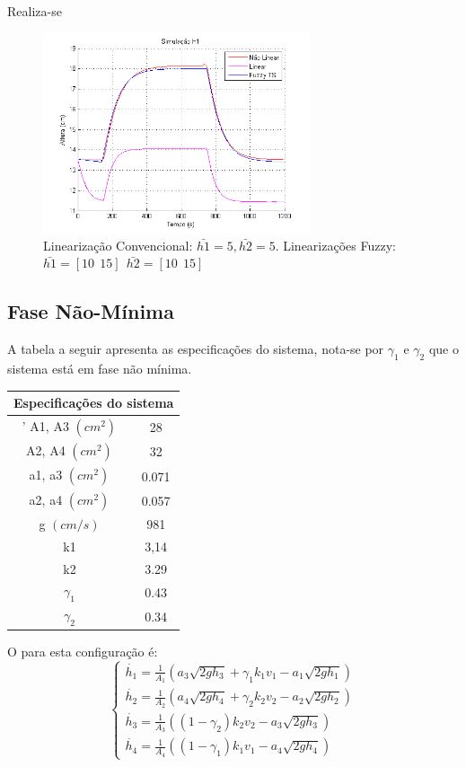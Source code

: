 Realiza-se
\begin{figure}[H]
	\centering
	\includegraphics[width=0.7\textwidth]{img/FM_h1_5_10_15.png}
	\caption{\small Linearização Convencional: $ \bar{h1}=5, \bar{h2}=5$. Linearizações Fuzzy: $\bar{h1}=[10 \ \ 15] \ \ \bar{h2}=[10 \ \ 15]$ }
	\label{figH1FM_1}
\end{figure}

\subsection{Fase Não-Mínima}
A tabela a seguir apresenta as especificações do sistema, nota-se por $\gamma_1$ e $\gamma_2$ que o sistema está em fase não mínima.
\begin{center}
	\begin{tabular}{|c|c|}
		\hline
		\multicolumn{2}{|c|}{Especificações do sistema} \\
		\hline'
		A1, A3 $(cm^2)$ & 28 \\ \hline
		A2, A4 $(cm^2)$ & 32 \\ \hline
		a1, a3 $(cm^2)$ & 0.071 \\ \hline
		a2, a4 $(cm^2)$ & 0.057 \\ \hline
		g $(cm/s)$ & 981 \\ \hline
		k1 & 3,14 \\ \hline
		k2 & 3.29 \\ \hline
		$\gamma_1$ & 0.43 \\ \hline
		$\gamma_2$ & 0.34 \\ \hline
		\hline
	\end{tabular}
\end{center}

O  para esta configuração é:
\begin{equation}
\begin{cases}
	\dot{h_{1}} = \frac{1}{A_{1}}(a_{3}\sqrt{2gh_{3}} + \gamma_{1}k_{1}v_{1} - a_{1}\sqrt{2gh_{1}})\\
	
	\dot{h_{2}} = \frac{1}{A_{2}}(a_{4}\sqrt{2gh_{4}} + \gamma_{2}k_{2}v_{2} - a_{2}\sqrt{2gh_{2}})\\
	
	\dot{h_{3}} = \frac{1}{A_{3}}((1 - \gamma_{2})k_{2}v_{2} - a_{3}\sqrt{2gh_{3}})\\
	
	\dot{h_{4}} = \frac{1}{A_{4}}((1 - \gamma_{1})k_{1}v_{1} - a_{4}\sqrt{2gh_{4}})
\end{cases}
\label{eqFMNL}
\end{equation}

